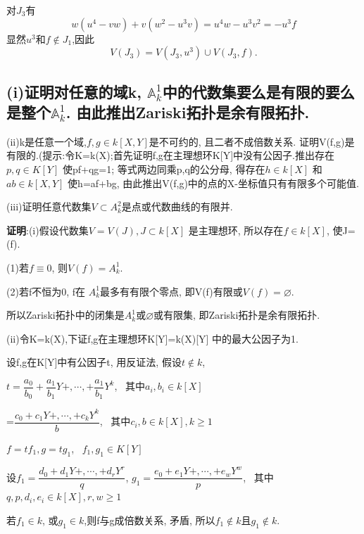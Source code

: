 \documentclass[UTF8]{book}
\begin{document}
	对$ J_{3} $有
	\begin{equation*}
	w(u^{4}-v w) + v(w^{2}-u^{3} v) = u^{4}w-u^{3}v^{2} = -u^{3}f
	\end{equation*}
	显然$ u^{3} $和$ f \notin J_{1}$,因此
	\begin{equation*}
	V(J_{3}) = V(J_{3},u^{3}) \cup V(J_{3},f).
	\end{equation*}
	
	
	
	\subsection{(i)证明对任意的域k, $\mathbb{A}^{1}_{k}$中的代数集要么是有限的要么是整个$\mathbb{A}^{1}_{k}$. 由此推出Zariski拓扑是余有限拓扑.}
	
	(ii)k是任意一个域,$ f,g\in k[X,Y]$是不可约的, 且二者不成倍数关系. 证明V(f,g)是有限的.(提示:令K=k(X);首先证明f,g在主理想环K[Y]中没有公因子.推出存在$p,q\in K[Y]$ 使pf+qg=1; 等式两边同乘p,q的公分母, 得存在$h\in k[X]$ 和 $ab\in k[X,Y]$ 使h=af+bg, 由此推出V(f,g)中的点的X-坐标值只有有限多个可能值.
	
	(iii)证明任意代数集$V \subset A^{2}_{k}$是点或代数曲线的有限并.
	
	\textbf{证明}:(i)假设代数集$V=V(J),J\subset k[X]$ 是主理想环, 所以存在$f\in k[X]$, 使J=(f).
	
	(1)若$f\equiv 0$, 则$V(f)=A^{1}_{k}$.
	
	(2)若f不恒为0, f在 $A^{1}_{k}$最多有有限个零点, 即V(f)有限或$V(f)=\varnothing$.
	
	所以Zariski拓扑中的闭集是$A^{1}_{k}$或$\varnothing$或有限集, 即Zariski拓扑是余有限拓扑.
	
	(ii)令K=k(X),下证f,g在主理想环K[Y]=k(X)[Y] 中的最大公因子为1.
	
	设f,g在K[Y]中有公因子t, 用反证法, 假设$t\notin k$,
	
	$t=\dfrac{a_{0}}{b_{0}}+\dfrac{a_{1}}{b_{1}}Y+, \cdots ,+\dfrac{a_{1}}{b_{1}}Y^{k}$, \  其中$a_{i},b_{i}\in k[X]$
	
	=$\dfrac{c_{0}+c_{1}Y+, \cdots ,+c_{k}Y^{k}}{b}$, \ 其中$c_{i},b\in k[X], k\geq 1$
	
	$f=tf_{1}, g=tg_{1}$, \ $f_{1},g_{1} \in K[Y]$
	
	设$f_{1}=\dfrac{d_{0}+d_{1}Y+, \cdots ,+d_{r}Y^{r}}{q}$, $g_{1}=\dfrac{e_{0}+e_{1}Y+, \cdots ,+e_{w}Y^{w}}{p}$, \ 其中$q,p ,d_{i}, e_{i}\in k[X], r,w\geq 1$
	
	若$f_{1}\in k$, 或$g_{1}\in k$,则f与g成倍数关系, 矛盾, 所以$f_{1}\notin k$且$g_{1}\notin k$.
	
\end{document}
